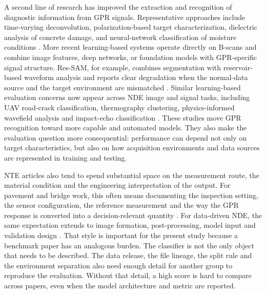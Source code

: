 \documentclass[]{interact}
\begin{document}
A second line of research has improved the extraction and recognition of diagnostic information from GPR signals. Representative approaches include time-varying deconvolution, polarization-based target characterization, dielectric analysis of concrete damage, and neural-network classification of moisture conditions \cite{economou2012deconvolution,lualdi2014polarisation,artagan2022thermal,kilic2014moisture}. More recent learning-based systems operate directly on B-scans and combine image features, deep networks, or foundation models with GPR-specific signal structure. Res-SAM, for example, combines segmentation with reservoir-based waveform analysis and reports clear degradation when the normal-data source and the target environment are mismatched \cite{zhou2025ressam}. Similar learning-based evaluation concerns now appear across NDE image and signal tasks, including UAV road-crack classification, thermography clustering, physics-informed wavefield analysis and impact-echo classification \cite{rathod2024uav,nategh2024kmeans,li2024pinn,qu2024impactecho}. These studies move GPR recognition toward more capable and automated models. They also make the evaluation question more consequential: performance can depend not only on target characteristics, but also on how acquisition environments and data sources are represented in training and testing.

NTE articles also tend to spend substantial space on the measurement route, the material condition and the engineering interpretation of the output. For pavement and bridge work, this often means documenting the inspection setting, the sensor configuration, the reference measurement and the way the GPR response is converted into a decision-relevant quantity \cite{hu2016pavement,plati2012structural,benedetto2012bridges,liu2024debonding,ibrahim2024thermography}. For data-driven NDE, the same expectation extends to image formation, post-processing, model input and validation design \cite{rathod2024uav,nategh2024kmeans,cheng2024fusion,qu2024impactecho}. That style is important for the present study because a benchmark paper has an analogous burden. The classifier is not the only object that needs to be described. The data release, the file lineage, the split rule and the environment separation also need enough detail for another group to reproduce the evaluation. Without that detail, a high score is hard to compare across papers, even when the model architecture and metric are reported.
\end{document}
